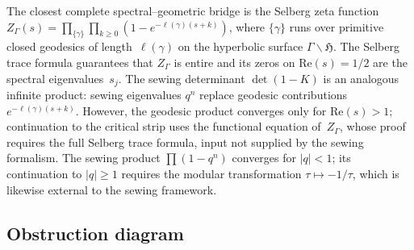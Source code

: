 \begin{remark}%
\label{rem:selberg-trace-arithmetic}%
%
The closest complete spectral--geometric bridge is the
Selberg zeta function
$Z_\Gamma(s) = \prod_{\{\gamma\}}\prod_{k\ge0}
(1 - e^{-\ell(\gamma)(s+k)})$,
where $\{\gamma\}$ runs over primitive closed geodesics of
length~$\ell(\gamma)$ on the hyperbolic surface
$\Gamma\backslash\mathfrak{H}$. The Selberg trace formula
guarantees that $Z_\Gamma$ is entire and its zeros on
$\mathrm{Re}(s) = 1/2$ are the spectral
eigenvalues~$s_j$. The sewing determinant $\det(1-K)$
is an analogous infinite product: sewing eigenvalues
$q^n$ replace geodesic contributions
$e^{-\ell(\gamma)(s+k)}$. However, the geodesic product
converges only for $\mathrm{Re}(s)>1$; continuation to
the critical strip uses the functional equation
of~$Z_\Gamma$, whose proof requires the full Selberg trace
formula, input not supplied by the sewing formalism. The
sewing product $\prod(1-q^n)$ converges for
$\lvert q\rvert < 1$; its continuation to
$\lvert q\rvert\ge 1$ requires the modular transformation
$\tau\mapsto -1/\tau$, which is likewise external to the
sewing framework.
\end{remark}

\subsection{Obstruction diagram}%
\label{subsec:polyakov-conformal-gauge-obstruction}%

